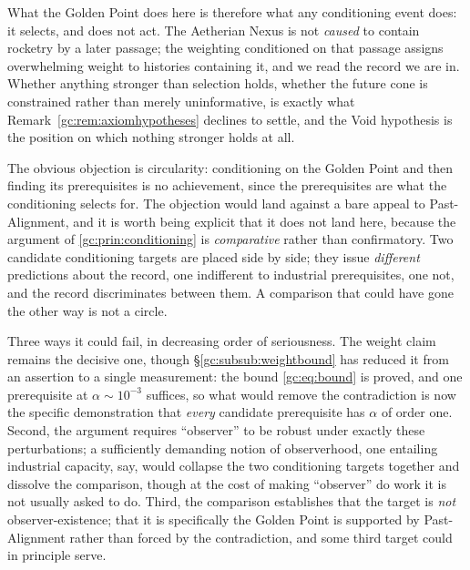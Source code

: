 \begin{remark}
What the Golden Point does here is therefore what any conditioning event
does: it selects, and does not act. The Aetherian Nexus is not
\emph{caused} to contain rocketry by a later passage; the weighting
conditioned on that passage assigns overwhelming weight to histories
containing it, and we read the record we are in. Whether anything
stronger than selection holds, whether the future cone is constrained
rather than merely uninformative, is exactly what
Remark~\ref{gc:rem:axiomhypotheses} declines to settle, and the Void hypothesis
is the position on which nothing stronger holds at all.
\end{remark}

\begin{remark}
\label{gc:rem:circularity}
The obvious objection is circularity: conditioning on the Golden Point
and then finding its prerequisites is no achievement, since the
prerequisites are what the conditioning selects for. The objection would
land against a bare appeal to Past-Alignment, and it is worth being
explicit that it does not land here, because the argument of
\ref{gc:prin:conditioning} is \emph{comparative} rather than
confirmatory. Two candidate conditioning targets are placed side by
side; they issue \emph{different} predictions about the record, one
indifferent to industrial prerequisites, one not, and the record
discriminates between them. A comparison that could have gone the other
way is not a circle.

Three ways it could fail, in decreasing order of seriousness. The weight claim remains the decisive one, though
\S\ref{gc:subsub:weightbound} has reduced it from an assertion to a
single measurement: the bound \eqref{gc:eq:bound} is proved, and one
prerequisite at $\alpha\sim10^{-3}$ suffices, so what would remove the
contradiction is now the specific demonstration that \emph{every}
candidate prerequisite has $\alpha$ of order one. Second, the
argument requires ``observer'' to be robust under exactly these
perturbations; a sufficiently demanding notion of observerhood, one
entailing industrial capacity, say, would collapse the two
conditioning targets together and dissolve the comparison, though at the
cost of making ``observer'' do work it is not usually asked to do.
Third, the comparison establishes that the target is \emph{not}
observer-existence; that it is specifically the Golden Point is
supported by Past-Alignment rather than forced by the contradiction, and
some third target could in principle serve.
\end{remark}


